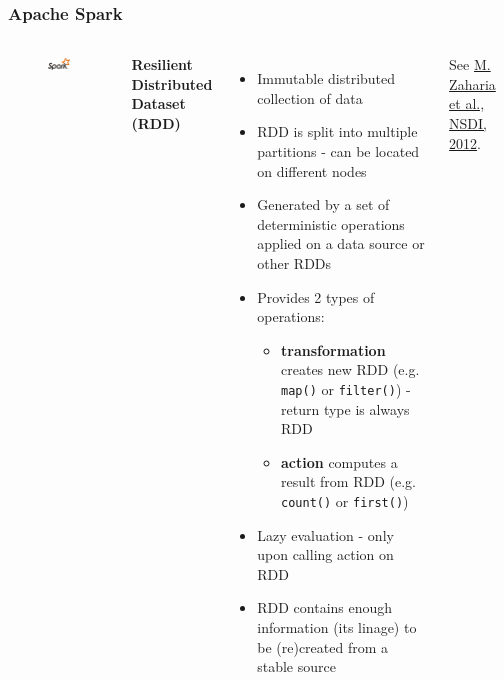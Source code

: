 \documentclass[10pt,utf8]{beamer}
\begin{document}
\begin{frame}
	\frametitle{Apache Spark}
	\begin{columns}
		\begin{figure}
			\centering
			\includegraphics[width=2cm]{./img/spark-logo.eps}
		\end{figure}
	\textbf{Resilient Distributed Dataset (RDD)}
		\begin{itemize}
			\item Immutable distributed collection of data
			\item RDD is split into multiple partitions - can be located on different nodes
			\item Generated by a set of deterministic operations applied on a data source or other RDDs
			\item Provides 2 types of operations:
			\begin{itemize}
				\item \textbf{transformation} creates new RDD (e.g. \texttt{map()} or \texttt{filter()}) - return type is always RDD
				\item \textbf{action} computes a result from RDD (e.g. \texttt{count()} or \texttt{first()})
			\end{itemize}
			\item Lazy evaluation - only upon calling action on RDD
			\item RDD contains enough information (its linage) to be (re)created from a stable source 
		\end{itemize}
		\vspace{0.5cm}
		See \color{blue}\href{https://www.usenix.org/conference/nsdi12/technical-sessions/presentation/zaharia}{M. Zaharia et al., NSDI, 2012}.
	\end{columns}
\end{frame}
	
\end{document}
